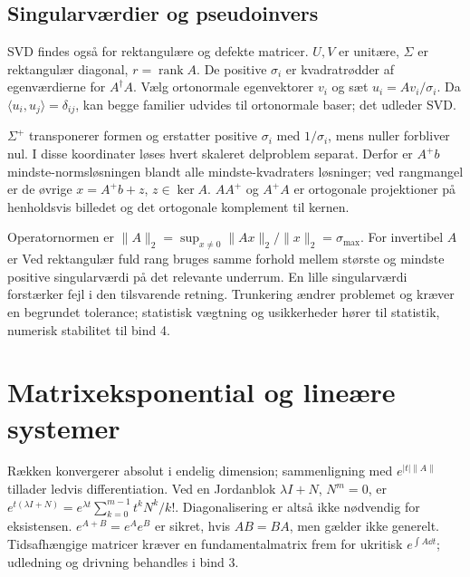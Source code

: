 \subsection{Singularværdier og pseudoinvers}
SVD findes også for rektangulære og defekte matricer.
$U,V$ er unitære, $\Sigma$ er rektangulær diagonal, $r=\operatorname{rank}A$.
De positive $\sigma_i$ er kvadratrødder af egenværdierne for $A^\dagger A$.
Vælg ortonormale egenvektorer $v_i$ og sæt $u_i=Av_i/\sigma_i$.
Da $\langle u_i,u_j\rangle=\delta_{ij}$, kan begge familier udvides til
ortonormale baser; det udleder SVD.



$\Sigma^+$ transponerer formen og erstatter positive $\sigma_i$ med
$1/\sigma_i$, mens nuller forbliver nul. I disse koordinater løses hvert
skaleret delproblem separat. Derfor er $A^+b$ mindste-normsløsningen
blandt alle mindste-kvadraters løsninger; ved rangmangel er de øvrige
$x=A^+b+z$, $z\in\ker A$.
$AA^+$ og $A^+A$ er ortogonale projektioner på henholdsvis billedet
og det ortogonale komplement til kernen.

Operatornormen er $\|A\|_2=\sup_{x\ne0}\|Ax\|_2/\|x\|_2=\sigma_{\max}$.
For invertibel $A$ er
Ved rektangulær fuld rang bruges samme forhold mellem største og mindste
positive singularværdi på det relevante underrum.
En lille singularværdi forstærker fejl i den tilsvarende retning.
Trunkering ændrer problemet og kræver en begrundet tolerance; statistisk
vægtning og usikkerheder hører til statistik, numerisk stabilitet til bind 4.

\section{Matrixeksponential og lineære systemer}
Rækken konvergerer absolut i endelig dimension; sammenligning med
$e^{|t|\|A\|}$ tillader ledvis differentiation.
Ved en Jordanblok $\lambda I+N$, $N^m=0$, er
$e^{t(\lambda I+N)}=e^{\lambda t}\sum_{k=0}^{m-1}t^kN^k/k!$.
Diagonalisering er altså ikke nødvendig for eksistensen.
$e^{A+B}=e^Ae^B$ er sikret, hvis $AB=BA$, men gælder ikke generelt.
Tidsafhængige matricer kræver en fundamentalmatrix frem for ukritisk
$e^{\int A\dd t}$; udledning og drivning behandles i bind 3.

